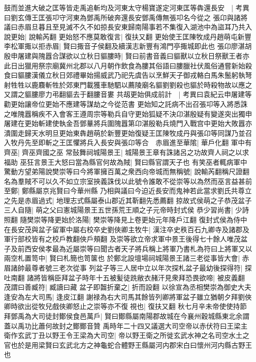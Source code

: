 鼓而並進大破之匡等皆走禹追斬均及河東太守楊寶遂定河東匡等犇還長安　|{
	考異曰劉玄傳王匡張卭守河東為鄧禹所破奔還長安鄧禹傳無張卭名今從之}
張卬與諸將議曰赤眉旦暮且至見滅不久不如掠長安東歸南陽事若不集復入湖池中為盜耳乃共入說更始|{
	說輸芮翻}
更始怒不應莫敢復言|{
	復扶又翻}
更始使王匡陳牧成丹趙萌屯新豐李松軍掫以拒赤眉|{
	賢曰掫音子侯翻及續漢志新豐有鴻門亭掫城即此也}
張卬廖湛胡殷申屠建與隗囂合謀欲以立秋日貙膢時|{
	賢曰前書音義曰貙獸以立秋日祭獸王者亦此日出獵用祭宗廟冀州北郡以八月朝作飲食為膢其俗語曰膢臘社伏風俗通嘗新始殺食曰貙膢漢儀立秋日郊禮畢始揚威武乃祀先虞告以烹鮮天子御戎輅白馬朱鬛躬執弩射牲牲以鹿麛斬牲於郊東門載獲車馳駟以薦陵廟名貙劉劉殺也貙於時殺物故以應之又謂之貙膢廖力弔翻貙去于翻膢音婁}
共刼更始俱成前計　|{
	考異曰袁紀云申屠建等勸更始讓帝位更始不應建等謀劫之今從范書}
更始知之託病不出召張卭等入將悉誅之唯隗囂稱疾不入會客王遵周宗等勒兵自守更始狐疑不決卬湛殷疑有變遂突出獨申屠建在更始斬建使執金吾鄧曅將兵圍隗囂第卬湛殷勒兵燒門入戰宫中更始大敗囂亦潰圍走歸天水明旦更始東犇趙萌於新豐更始復疑王匡陳牧成丹與張卬等同謀乃並召入牧丹先至即斬之王匡懼將兵入長安與張卬等合　赤眉進至華隂|{
	華戶化翻}
軍中有齊巫|{
	齊巫齊國之巫}
常鼔舞祠城陽景王|{
	城陽景王章有誅諸呂之功故齊人祠之以求福助}
巫狂言景王大怒曰當為縣官何故為賊|{
	賢曰縣官謂天子也}
有笑巫者輒病軍中驚動方望弟陽說樊崇等曰今將軍擁百萬之衆西向帝城而無稱號|{
	說輸芮翻稱尺證翻}
名為羣賊不可以久不如立宗室挾義誅伐以此號令誰敢不從崇等以為然而巫言益甚前至鄭|{
	鄭縣屬京兆賢曰今華州縣}
乃相與議曰今迫近長安而鬼神若此當求劉氏共尊立之先是赤眉過式|{
	地理志式縣屬泰山郡近其靳翻先悉薦翻}
掠故式侯萌之子恭茂盆子三人自隨|{
	萌之父曰憲城陽景王五世孫荒王順之子元帝時封式侯}
恭少習尚書|{
	少詩照翻}
隨樊崇等降更始於洛陽|{
	樊崇等降見上卷更始元年降戶江翻}
復封式侯為侍中在長安茂與盆子留軍中屬右校卒史劉俠卿主牧牛|{
	漢注卒史秩百石九卿寺及諸郡及軍行部校皆有之校戶教翻俠戶頰翻}
及崇等欲立帝求軍中景王後得七十餘人唯茂盆子及前西安侯孝最為近屬崇等曰聞古者天子將兵稱上將軍乃書札為符曰上將軍又以兩空札置笥中|{
	賢曰札簡也笥箧也}
於鄭北設壇場祠城陽景王諸三老從事皆大會|{
	赤眉諸帥最尊者號三老次從事}
列盆子等三人居中立以年次探札盆子最幼後探得符|{
	探吐南翻}
諸將皆稱臣拜盆子時年十五被髪徒跣敝衣赭汗見衆拜恐畏欲啼|{
	被皮義翻}
茂謂曰善臧符|{
	臧讀曰藏}
盆子即齧折棄之|{
	折而設翻}
以徐宣為丞相樊崇為御史大夫逢安為左大司馬|{
	逢皮江翻}
謝禄為右大司馬其餘皆列卿將軍盆子雖立猶朝夕拜劉俠卿時欲出從牧兒戲俠卿怒止之崇等亦不復視也|{
	復扶又翻}
秋七月辛未帝使使持節拜鄧禹為大司徒封鄼侯食邑萬戶|{
	賢曰鄼縣屬南陽郡故城在今襄州穀城縣東北余謂蓋以禹功比蕭何故封之鄼鄼音贊}
禹時年二十四又議選大司空帝以赤伏符曰王梁主衛作玄武丁丑以野王令王梁為大司空|{
	帝以野王衛之所徙玄武水神之名司空水土之官也於是用梁賢曰玄武北方之神龜蛇合體野王縣屬河内郡宋白曰懷州河内縣古野王也}
